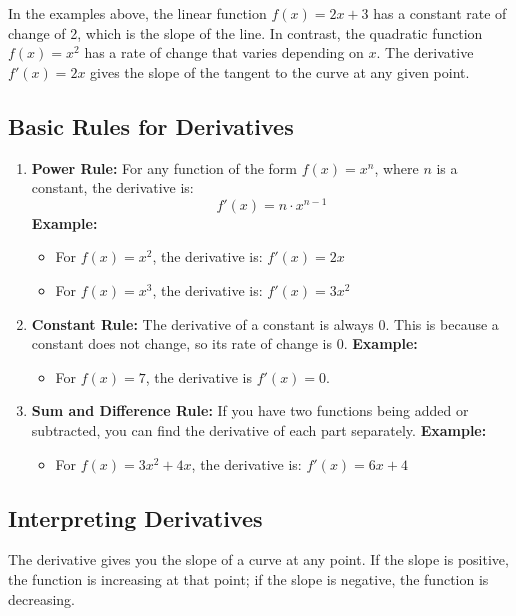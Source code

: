 In the examples above, the linear function \( f(x) = 2x + 3 \) has a constant rate of change of 2, which is the slope of the line. In contrast, the quadratic function \( f(x) = x^2 \) has a rate of change that varies depending on \( x \). The derivative \( f'(x) = 2x \) gives the slope of the tangent to the curve at any given point.


\subsection{Basic Rules for Derivatives}
\begin{enumerate}
    \item \textbf{Power Rule:} For any function of the form \( f(x) = x^n \), where \( n \) is a constant, the derivative is:
    \[
    f'(x) = n \cdot x^{n-1}
    \]
    \textbf{Example:}
    \begin{itemize}
        \item For \( f(x) = x^2 \), the derivative is: \( f'(x) = 2x \)
        \item For \( f(x) = x^3 \), the derivative is: \( f'(x) = 3x^2 \)
    \end{itemize}
    \item \textbf{Constant Rule:} The derivative of a constant is always 0. This is because a constant does not change, so its rate of change is 0.
    \textbf{Example:}
    \begin{itemize}
        \item For \( f(x) = 7 \), the derivative is \( f'(x) = 0 \).
    \end{itemize}
    \item \textbf{Sum and Difference Rule:} If you have two functions being added or subtracted, you can find the derivative of each part separately.
    \textbf{Example:}
    \begin{itemize}
        \item For \( f(x) = 3x^2 + 4x \), the derivative is: \( f'(x) = 6x + 4 \)
    \end{itemize}
\end{enumerate}

\subsection{Interpreting Derivatives}
The derivative gives you the slope of a curve at any point. If the slope is positive, the function is increasing at that point; if the slope is negative, the function is decreasing.

